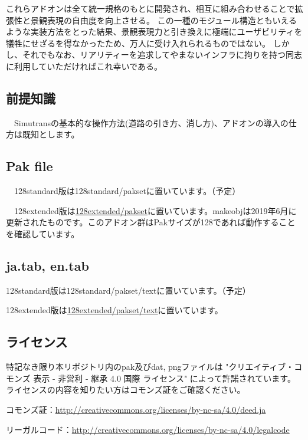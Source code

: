 \documentclass{jbook}
\begin{document}
これらアドオンは全て統一規格のもとに開発され、相互に組み合わせることで拡張性と景観表現の自由度を向上させる。
この一種のモジュール構造ともいえるような実装方法をとった結果、景観表現力と引き換えに極端にユーザビリティを犠牲にせざるを得なかったため、万人に受け入れられるものではない。
しかし、それでもなお、リアリティーを追求してやまないインフラに拘りを持つ同志に利用していただければこれ幸いである。

\subsection*{前提知識}
　Simutransの基本的な操作方法(道路の引き方、消し方)、アドオンの導入の仕方は既知とします。

\subsection*{Pak file}
　128standard版は128standard/paksetに置いています。（予定）

　128extended版は\href{https://github.com/anoKTOK/Yokubari_roads_set_ver_anoKTOK/tree/main/128extended/pakset}{128extended/pakset}に置いています。makeobjは2019年6月に更新されたものです。このアドオン群はPakサイズが128であれば動作することを確認しています。

\subsection*{ja.tab, en.tab}
128standard版は128standard/pakset/textに置いています。（予定）

128extended版は\href{https://github.com/anoKTOK/Yokubari_roads_set_ver_anoKTOK/tree/main/128extended/pakset/text}{128extended/pakset/text}に置いています。


\subsection*{ライセンス}
特記なき限り本リポジトリ内のpak及びdat, pngファイルは
"クリエイティブ・コモンズ 表示 - 非営利 - 継承 4.0 国際 ライセンス"
によって許諾されています。ライセンスの内容を知りたい方はコモンズ証をご確認ください。

コモンズ証：\href{http://creativecommons.org/licenses/by-nc-sa/4.0/deed.ja}{http://creativecommons.org/licenses/by-nc-sa/4.0/deed.ja}

リーガルコード：\href{http://creativecommons.org/licenses/by-nc-sa/4.0/legalcode}{http://creativecommons.org/licenses/by-nc-sa/4.0/legalcode}
\end{document}
